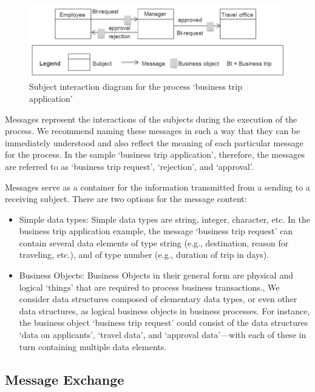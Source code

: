 \begin{figure}
	\centering
	\includegraphics[width=14cm]{20181026-Ontologie-Bilder/Grafiken-Ontologie/SUbject-Interaction/Beispiel-Subject-Interaction}
	\caption[Subject interaction diagram]{Subject interaction diagram for the process ‘business trip application’}
	\label{fig:beispiel-subject-interaction}
\end{figure}


Messages represent the interactions of the subjects during the execution of the process. We recommend naming these messages in such a way that they can be immediately understood and also reflect the meaning of each particular message for the process. In the sample ‘business trip application’, therefore, the messages are referred to as ‘business trip request’, ‘rejection’, and ‘approval’.

Messages serve as a container for the information transmitted from a sending to a receiving subject. There are two options for the message content:

\begin{itemize}
	\item 	Simple data types: Simple data types are string, integer, character, etc. In the business trip application example, the message ‘business trip request’ can contain several data elements of type string (e.g., destination, reason for traveling, etc.), and of type number (e.g., duration of trip in days).
	\item Business Objects: Business Objects in their general form are physical and logical ‘things’ that are required to process business transactions., We consider data structures composed of elementary data types, or even other data structures, as logical business objects in business processes. For instance, the business object ‘business trip request’ could consist of the data structures ‘data on applicants’, ‘travel data’, and ‘approval data’—with each of these in turn containing multiple data elements.
\end{itemize}


\subsection{Message Exchange}

